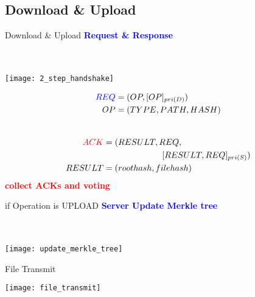 \subsection{Download \& Upload}
\begin{frame}{Download \& Upload}
	\centering
	\textcolor{blue}{\textbf{Request \& Response}}\\
	~\\
	~\\
	\begin{minipage}{.45\textwidth}
        \texttt{[image: 2\_step\_handshake]}
    \end{minipage}%
	\begin{minipage}{.55\textwidth}
    	\footnotesize
		\centering
		\begin{equation} \label{eq1}
                \begin{split}
                        \textcolor{blue}{REQ} & = (OP, [OP]_{pri(D)}) \\
                        OP & = (TYPE, PATH, HASH) \\
                \end{split}
        \end{equation}
        \divider{}\\
        \begin{equation} \label{eq2}
                \begin{split}
                        \textcolor{red}{ACK} & = (RESULT, REQ,\\
                        & \tab{}\tab{}[RESULT, REQ]_{pri(S)}) \\
                        RESULT & = (roothash, filehash)
                \end{split}
        \end{equation}
        \textcolor{red}{\textbf{collect ACKs and voting}}
    \end{minipage}%
\end{frame}

\begin{frame}{if Operation is UPLOAD}
	\centering
	\textcolor{blue}{\textbf{Server Update Merkle tree}}\\
	~\\
	~\\
	\begin{center}
		\texttt{[image: update\_merkle\_tree]}
	\end{center}
\end{frame}

\begin{frame}{File Transmit}
	\begin{center}
		\texttt{[image: file\_transmit]}
	\end{center}
\end{frame}

